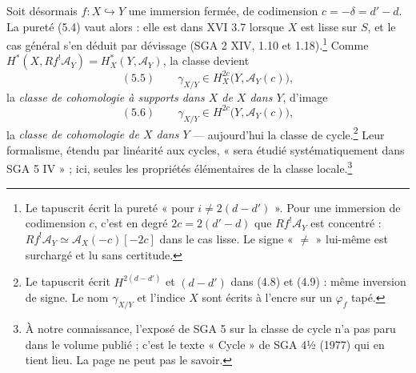 \documentclass[11pt,a4paper]{article}
\begin{document}
Soit désormais $f\colon X \hookrightarrow Y$ une immersion fermée, de
codimension $c = -\delta = d' - d$. La pureté (5.4) vaut alors : elle est dans
XVI 3.7 lorsque $X$ est lisse sur $S$, et le cas général s'en déduit par
dévissage (SGA 2 XIV, 1.10 et 1.18).\footnote{Le tapuscrit écrit la pureté
« pour $i \neq 2(d-d')$ ». Pour une immersion de codimension $c$, c'est en
degré $2c = 2(d'-d)$ que $Rf^!\mathcal{A}_Y$ est concentré :
$Rf^!\mathcal{A}_Y \simeq \mathcal{A}_X(-c)[-2c]$ dans le cas lisse. Le signe
« $\neq$ » lui-même est surchargé et lu sans certitude.} Comme
$H^*(X, Rf^!\mathcal{A}_Y) = H^*_X(Y, \mathcal{A}_Y)$, la classe devient
\[
(5.5)\qquad \gamma_{X/Y} \in H^{2c}_X\bigl(Y, \mathcal{A}_Y(c)\bigr),
\]
la \emph{classe de cohomologie à supports dans $X$ de $X$ dans $Y$}, d'image
\[
(5.6)\qquad \gamma_{X/Y} \in H^{2c}\bigl(Y, \mathcal{A}_Y(c)\bigr),
\]
la \emph{classe de cohomologie de $X$ dans $Y$} --- aujourd'hui la classe de
cycle.\footnote{Le tapuscrit écrit $H^{2(d-d')}$ et $(d-d')$ dans (4.8) et
(4.9) : même inversion de signe. Le nom $\gamma_{X/Y}$ et l'indice $X$ sont
écrits à l'encre sur un $\varphi_f$ tapé.} Leur formalisme, étendu par
linéarité aux cycles, « sera étudié systématiquement dans SGA 5 IV » ; ici,
seules les propriétés élémentaires de la classe locale.\footnote{À notre
connaissance, l'exposé de SGA 5 sur la classe de cycle n'a pas paru dans le
volume publié ; c'est le texte « Cycle » de SGA 4½ (1977) qui en tient lieu. La
page ne peut pas le savoir.}
\end{document}
